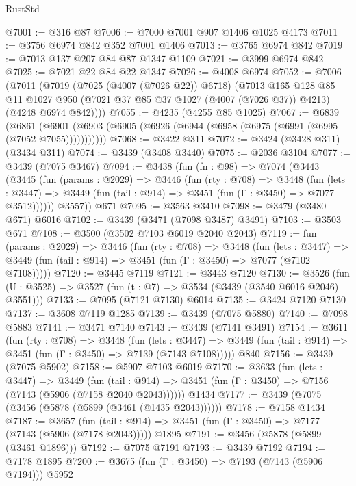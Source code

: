 \begin{lexlean}{RustStd}
\begin{coremodule}
@7001 := @316 @87
@7006 := @7000 @7001 @907 @1406 @1025 @4173
@7011 := @3756 @6974 @842 @352 @7001 @1406
@7013 := @3765 @6974 @842
@7019 := @7013 @137 @207 @84 @87 @1347 @1109
@7021 := @3999 @6974 @842
@7025 := @7021 @22 @84 @22 @1347
@7026 := @4008 @6974
@7052 := @7006
    (@7011
      (@7019
        (@7025 (@4007 (@7026 @22)) @6718)
        (@7013
          @165
          @128
          @85
          @11
          @1027
          @950
          (@7021 @37 @85 @37 @1027 (@4007 (@7026 @37)) @4213)
          (@4248 @6974 @842))))
@7055 := @4235 (@4255 @85 @1025)
@7067 := @6839
    (@6861 (@6901 (@6903 (@6905 (@6926 (@6944 (@6958 (@6975 (@6991 (@6995 (@7052 @7055)))))))))))
@7068 := @3422 @311
@7072 := @3424 (@3428 @311) (@3434 @311)
@7074 := @3439 (@3408 @3440)
@7075 := @2036 @3104
@7077 := @3439 (@7075 @3467)
@7094 := @3438
    (fun (fn : @98) =>
    @7074
      (@3443
        (@3445
          (fun (params : @2029) =>
          @3446
            (fun (rty : @708) =>
            @3448
              (fun (lets : @3447) =>
              @3449 (fun (tail : @914) => @3451 (fun (Γ : @3450) => @7077 @3512))))))
        @3557))
    @671
@7095 := @3563 @3410
@7098 := @3479 (@3480 @671) @6016
@7102 := @3439 (@3471 (@7098 @3487) @3491)
@7103 := @3503 @671
@7108 := @3500 (@3502 @7103 @6019 @2040 @2043)
@7119 := fun (params : @2029) =>
  @3446
    (fun (rty : @708) =>
    @3448
      (fun (lets : @3447) =>
      @3449 (fun (tail : @914) => @3451 (fun (Γ : @3450) => @7077 (@7102 @7108)))))
@7120 := @3445 @7119
@7121 := @3443 @7120
@7130 := @3526 (fun (U : @3525) => @3527 (fun (t : @7) => @3534 (@3439 (@3540 @6016 @2046) @3551)))
@7133 := @7095 (@7121 @7130) @6014
@7135 := @3424 @7120 @7130
@7137 := @3608 @7119 @1285
@7139 := @3439 (@7075 @5880)
@7140 := @7098 @5883
@7141 := @3471 @7140
@7143 := @3439 (@7141 @3491)
@7154 := @3611
    (fun (rty : @708) =>
    @3448
      (fun (lets : @3447) =>
      @3449 (fun (tail : @914) => @3451 (fun (Γ : @3450) => @7139 (@7143 @7108)))))
    @840
@7156 := @3439 (@7075 @5902)
@7158 := @5907 @7103 @6019
@7170 := @3633
    (fun (lets : @3447) =>
    @3449
      (fun (tail : @914) => @3451 (fun (Γ : @3450) => @7156 (@7143 (@5906 (@7158 @2040 @2043))))))
    @1434
@7177 := @3439 (@7075 (@3456 (@5878 (@5899 (@3461 (@1435 @2043))))))
@7178 := @7158 @1434
@7187 := @3657
    (fun (tail : @914) => @3451 (fun (Γ : @3450) => @7177 (@7143 (@5906 (@7178 @2043)))))
    @1895
@7191 := @3456 (@5878 (@5899 (@3461 @1896)))
@7192 := @7075 @7191
@7193 := @3439 @7192
@7194 := @7178 @1895
@7200 := @3675 (fun (Γ : @3450) => @7193 (@7143 (@5906 @7194))) @5952

\end{coremodule}
\end{lexlean}
